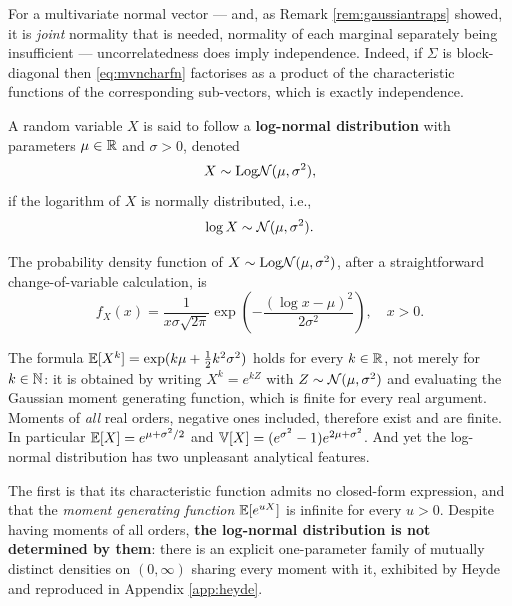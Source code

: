 For a multivariate normal vector --- and, as Remark \ref{rem:gaussiantraps} showed, it is \emph{joint} normality that is needed, normality of each marginal separately being insufficient --- uncorrelatedness does imply independence. Indeed, if $\Sigma$ is block-diagonal then \eqref{eq:mvncharfn} factorises as a product of the characteristic functions of the corresponding sub-vectors, which is exactly independence.

\begin{example}
A random variable \( X \) is said to follow a \textbf{log-normal distribution} with parameters \( \mu \in \mathbb{R} \) and \( \sigma > 0 \), denoted
\begin{equation}
X \sim \text{Log}\mathcal{N}(\mu, \sigma^2),
\end{equation}
if the logarithm of \( X \) is normally distributed, i.e.,
\begin{equation}
\log X \sim \mathcal{N}(\mu, \sigma^2).
\end{equation}
\end{example}

The probability density function of \( X \sim \text{Log}\mathcal{N}(\mu, \sigma^2) \), after a straightforward change-of-variable calculation, is
\begin{equation}
f_X(x) = \frac{1}{x \sigma \sqrt{2\pi}} \exp\left( -\frac{(\log x - \mu)^2}{2\sigma^2} \right), \quad x > 0.
\end{equation}

The formula $\mathbb{E}[X^k] = \exp(k\mu + \tfrac12 k^2\sigma^2)$ holds for every $k \in \mathbb{R}$,
not merely for $k \in \mathbb{N}$: it is obtained by writing $X^k = e^{kZ}$ with
$Z \sim \mathcal{N}(\mu,\sigma^2)$ and evaluating the Gaussian moment generating function, which is
finite for every real argument. Moments of \emph{all} real orders, negative ones included, therefore
exist and are finite. In particular $\mathbb{E}[X] = e^{\mu+\sigma^2/2}$ and
$\mathbb{V}[X] = (e^{\sigma^2}-1)e^{2\mu+\sigma^2}$. And yet the
log-normal distribution has two unpleasant analytical features.

The first is that its characteristic function admits no closed-form expression, and that the \emph{moment generating function} $\mathbb{E}[e^{uX}]$ is infinite for every $u > 0$.
 Despite having moments of all orders, \textbf{the log-normal distribution is not determined by them}: there is an explicit one-parameter family of mutually distinct densities on $(0,\infty)$ sharing every moment with it, exhibited by Heyde \cite{heyde1963} and reproduced in Appendix \ref{app:heyde}. 
 
